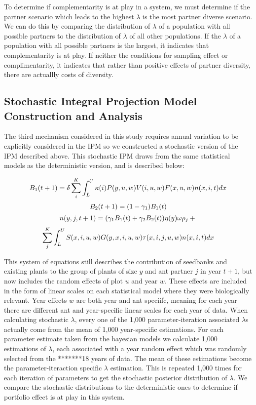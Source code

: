 \documentclass[11pt]{article}
\begin{document}
To determine if complementarity is at play in a system, we must determine if the partner scenario which leads to the highest $\lambda$ is the most partner diverse scenario.
We can do this by comparing the distribution of $\lambda$ of a population with all possible partners to the distribution of $\lambda$ of all other populations.
If the $\lambda$ of a population with all possible partners is the largest, it indicates that complementarity is at play.
If neither the conditions for sampling effect or complimentarity, it indicates that rather than positive effects of partner diversity, there are actuallly costs of diversity.

\subsection*{Stochastic Integral Projection Model Construction and Analysis}
  
The third mechanism considered in this study requires annual variation to be explicitly considered in the IPM so we constructed a stochastic version of the IPM described above. 
This stochastic IPM draws from the same statistical models as the deterministic version, and is described below:

 \begin{linenomath*}
	$$
	B_1(t+1) = \delta \sum_{i}^{K} \int_L^U  \kappa(i) P(y,u,w) V(i,u,w) F(x,u,w) n(x,i,t) dx \\
	$$
	$$
	B_2(t+1) =  (1 - \gamma_1)B_1(t)\\
	$$
	$$
	n(y,j,t+1) = (\gamma_1 B_1(t) + \gamma_2 B_2(t)) \eta(y) \omega \rho_j  + \\
	$$
	$$
	\sum_{j}^{K} \int_L^U S(x,i,u,w) G(y,x,i,u,w) \tau(x,i,j,u,w) n(x,i,t) dx \\
	$$
\end{linenomath*}

This system of equations still describes the contribution of seedbanks and existing plants to the group of plants of size $y$ and ant partner $j$ in year $t+1$, but now includes the random effects of plot $u$ and year $w$. 
These effects are included in the form of linear scales on each statistical model where they were biologically relevant.
Year effects $w$ are both year and ant speciifc, meaning for each year there are different ant and year-specific linear scales for each year of data. 
When calculating stochastic $\lambda$, every one of the 1,000 parameter-iteration associated $\lambda$s actually come from the mean of 1,000 year-specific estimations. 
For each parameter estimate taken from the bayesian models we calculate 1,000 estimations of $\lambda$, each associated with a year random effect which was randomly selected from the *******18 years of data.
The mean of these estimations become the parameter-iteraction specific $\lambda$ estimation. 
This is repeated 1,000 times for each iteration of parameters to get the stochastic posterior distribution of $\lambda$.
We compare the stochastic distributions to the deterministic ones to determine if portfolio effect is at play in this system. 
\end{document}
